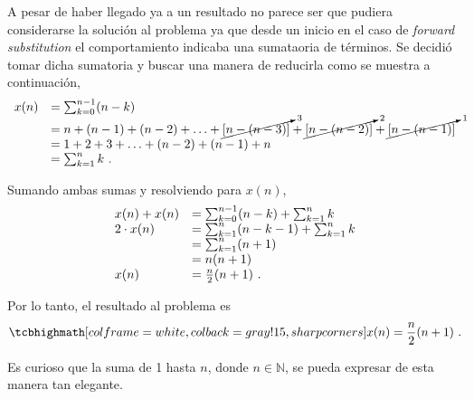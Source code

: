 \begin{enumerate}[label=\textbf{\alph*.}]
\begin{solution}
        A pesar de haber llegado ya a un resultado no parece ser que pudiera considerarse la solución al problema ya que desde un inicio en el caso de \textit{forward substitution} el comportamiento indicaba una sumataoria de términos. Se decidió tomar dicha sumatoria y buscar una manera de reducirla como se muestra a continuación,
        \begin{equation*}
            \begin{array}{l l}
                x(n) & = \sum_{k=0}^{n-1} (n - k) \\
                & = n + (n - 1) + (n - 2) + \ldots + \cancelto{3}{\left[n - (n - 3)\right]} + \cancelto{2}{\left[n - (n - 2)\right]} + \cancelto{1}{\left[n - (n - 1)\right]} \\
                & = 1 + 2 + 3 + \ldots + (n - 2) + (n - 1) + n \\
                & = \sum_{k=1}^{n} k\ .
            \end{array}
        \end{equation*}
        
        Sumando ambas sumas y resolviendo para $x(n)$,
        \begin{equation*}
            \begin{array}{l l}
                x(n) + x(n) & = \sum_{k=0}^{n-1} (n - k) + \sum_{k=1}^{n} k \\
                {2} \cdot {x(n)} & = \sum_{k=1}^{n} (n - k - 1) + \sum_{k=1}^{n} k \\
                & = \sum_{k=1}^{n} (n + 1) \\
                & = n (n + 1) \\
                x(n) & = \frac{n}{2} (n + 1)\ .
            \end{array}
        \end{equation*}

        Por lo tanto, el resultado al problema es
        \begin{equation}
            \result{x(n) = \frac{n}{2} (n + 1)\ .}
        \end{equation}

        Es curioso que la suma de 1 hasta $n$, donde $n \in \mathbb{N}$, se pueda expresar de esta manera tan elegante.

    \end{solution}
    

\end{enumerate}
